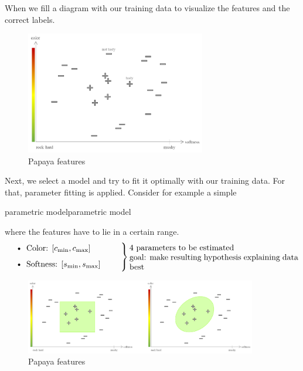 When we fill a diagram with our training data to visualize the features and the correct labels.

\begin{figure}[h]
  \centering
  \includegraphics[width=0.7\textwidth]{assets/slf/papaya_testdata__0.png} 
  \caption{Papaya features}
\end{figure}

Next, we select a model and try to fit it optimally with our training data. For that, parameter fitting is applied.
Consider for example a simple \begin{tikzborder}{parametric model}{parametric model}\end{tikzborder} where the features have to lie in a certain range.
\begin{equation*}
  \begin{array}{@{}l@{}}
      \begin{minipage}[b]{0.4\textwidth}
          \begin{itemize}
              \item Color: $[c_{\min}, c_{\max}]$
              \item Softness: $[s_{\min}, s_{\max}]$
          \end{itemize}
      \end{minipage}
  \end{array}
  \left.\begin{array}{@{}c@{}}
      \\
      \\
      \\
  \end{array}\right\}\begin{minipage}{0.6\textwidth}
    4 parameters to be estimated\\
    goal: make resulting hypothesis explaining data best
\end{minipage}
\end{equation*}


\begin{figure}[h]
  \centering
  \includegraphics[width=0.9\textwidth]{assets/slf/papaya__1.png} 
  \caption{Papaya features}
\end{figure}